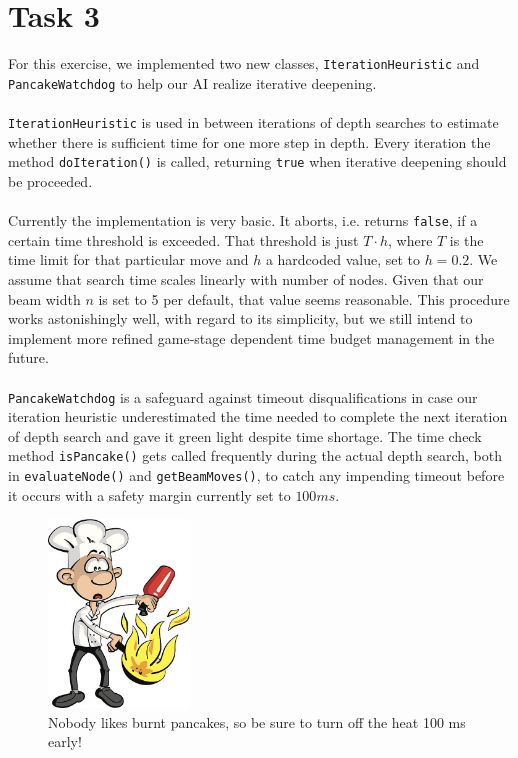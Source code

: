 \documentclass[a4paper,12pt]{article}
\begin{document}
\newpage

\section{Task 3}
For this exercise, we implemented two new classes, \texttt{IterationHeuristic} and \texttt{PancakeWatchdog} to help our AI realize iterative deepening.
\\ \\
\texttt{IterationHeuristic} is used in between iterations of depth searches to estimate whether there is sufficient time for one more step in depth. Every iteration the method \texttt{doIteration()} is called, returning \texttt{true} when iterative deepening should be proceeded.
\\ \\
Currently the implementation is very basic. It aborts, i.e. returns \texttt{false}, if a certain time threshold is exceeded. That threshold is just $T\cdot h$, where $T$ is the time limit for that particular move and $h$ a hardcoded value, set to $h=0.2$. We assume that search time scales linearly with number of nodes. Given that our beam width $n$ is set to 5 per default, that value seems reasonable. This procedure works astonishingly well, with regard to its simplicity, but we still intend to implement more refined game-stage dependent time budget management in the future.
\\ \\
\texttt{PancakeWatchdog} is a safeguard against timeout disqualifications in case our iteration heuristic underestimated the time needed to complete the next iteration of depth search and gave it green light despite time shortage. The time check method \texttt{isPancake()} gets called frequently during the actual depth search, both in \texttt{evaluateNode()} and \texttt{getBeamMoves()}, to catch any impending timeout before it occurs with a safety margin currently set to $100 ms$.

\begin{figure}[H]
    \centering
    \includegraphics[height=5cm]{pictures/assignment4/burned_pancake.jpg}
    \caption*{Nobody likes burnt pancakes, so be sure to turn off the heat 100 ms early!}
    \label{fig:burned_pancake}
\end{figure}
\end{document}
